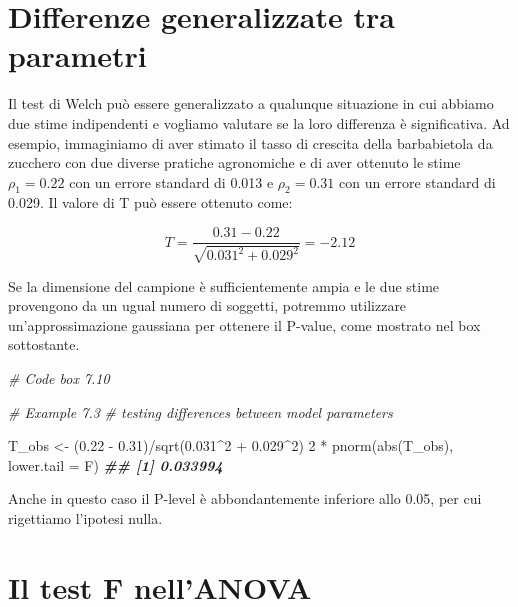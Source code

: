 \documentclass[
  12pt,
]{book}
\newenvironment{Shaded}{\begin{snugshade}}{\end{snugshade}}
\newcommand{\AttributeTok}[1]{\textcolor[rgb]{0.77,0.63,0.00}{#1}}
\newcommand{\CommentTok}[1]{\textcolor[rgb]{0.56,0.35,0.01}{\textit{#1}}}
\newcommand{\DecValTok}[1]{\textcolor[rgb]{0.00,0.00,0.81}{#1}}
\newcommand{\DocumentationTok}[1]{\textcolor[rgb]{0.56,0.35,0.01}{\textbf{\textit{#1}}}}
\newcommand{\FloatTok}[1]{\textcolor[rgb]{0.00,0.00,0.81}{#1}}
\newcommand{\FunctionTok}[1]{\textcolor[rgb]{0.00,0.00,0.00}{#1}}
\newcommand{\NormalTok}[1]{#1}
\newcommand{\OtherTok}[1]{\textcolor[rgb]{0.56,0.35,0.01}{#1}}
\newcommand{\SpecialCharTok}[1]{\textcolor[rgb]{0.00,0.00,0.00}{#1}}
\begin{document}
\hypertarget{differenze-generalizzate-tra-parametri}{%
\section{Differenze generalizzate tra parametri}\label{differenze-generalizzate-tra-parametri}}

Il test di Welch può essere generalizzato a qualunque situazione in cui abbiamo due stime indipendenti e vogliamo valutare se la loro differenza è significativa. Ad esempio, immaginiamo di aver stimato il tasso di crescita della barbabietola da zucchero con due diverse pratiche agronomiche e di aver ottenuto le stime \(\rho_1 = 0.22\) con un errore standard di 0.013 e \(\rho_2 = 0.31\) con un errore standard di 0.029. Il valore di T può essere ottenuto come:

\[T = \frac{0.31 - 0.22}{\sqrt{0.031^2 + 0.029^2}} = -2.12\]

Se la dimensione del campione è sufficientemente ampia e le due stime provengono da un ugual numero di soggetti, potremmo utilizzare un'approssimazione gaussiana per ottenere il P-value, come mostrato nel box sottostante.

\begin{Shaded}
\begin{Highlighting}[]
\CommentTok{\# Code box 7.10}

\CommentTok{\# Example 7.3}
\CommentTok{\# testing differences between model parameters}

\NormalTok{T\_obs }\OtherTok{\textless{}{-}}\NormalTok{ (}\FloatTok{0.22} \SpecialCharTok{{-}} \FloatTok{0.31}\NormalTok{)}\SpecialCharTok{/}\FunctionTok{sqrt}\NormalTok{(}\FloatTok{0.031}\SpecialCharTok{\^{}}\DecValTok{2} \SpecialCharTok{+} \FloatTok{0.029}\SpecialCharTok{\^{}}\DecValTok{2}\NormalTok{)}
\DecValTok{2} \SpecialCharTok{*} \FunctionTok{pnorm}\NormalTok{(}\FunctionTok{abs}\NormalTok{(T\_obs), }\AttributeTok{lower.tail =}\NormalTok{ F)}
\DocumentationTok{\#\# [1] 0.033994}
\end{Highlighting}
\end{Shaded}

Anche in questo caso il P-level è abbondantemente inferiore allo 0.05, per cui rigettiamo l'ipotesi nulla.

\hypertarget{il-test-f-nellanova}{%
\section{Il test F nell'ANOVA}\label{il-test-f-nellanova}}
\end{document}
